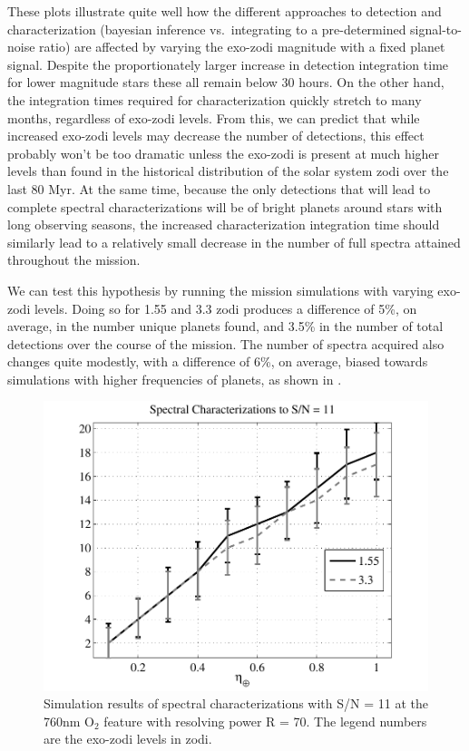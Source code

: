  These plots illustrate quite well how the different approaches to detection and characterization (bayesian inference vs.~integrating to a pre-determined signal-to-noise ratio) are affected by varying the exo-zodi magnitude with a fixed  planet signal.  Despite the proportionately larger increase in detection integration time for lower magnitude stars these all remain below 30 hours.  On the other hand, the integration times required for characterization quickly stretch to many months, regardless of exo-zodi levels.  From this, we can predict that while increased exo-zodi levels may decrease the number of detections, this effect probably won't be too dramatic unless the exo-zodi is present at much higher levels than found in the historical distribution of the solar system zodi over the last 80 Myr.  At the same time, because the only detections that will lead to complete spectral characterizations will be of bright planets around stars with long observing seasons, the increased characterization integration time should similarly lead to a relatively small decrease in the number of full spectra attained throughout the mission.
 
We can test this hypothesis by running the mission simulations with varying exo-zodi levels.  Doing so for 1.55 and 3.3 zodi produces a difference of 5\%, on average, in the number unique planets found, and 3.5\% in the number of total detections over the course of the mission.  The number of spectra acquired also changes quite modestly, with a difference of 6\%, on average, biased towards simulations with higher frequencies of planets, as shown in .
\begin{figure}[ht]
 \begin{center}
   \includegraphics[width=4.5in,clip=true,trim=0.25in 0in 0.5in 0.05in]{./figures/ASPECTRA_varZ}
 \end{center}
 \caption[Spectral characterizations at varying exo-zodi levels]{ \label{fig:ASPECTRA_varZ} Simulation results of spectral characterizations with S/N = 11 at the 760nm O$_2$ feature with resolving power R = 70. The legend numbers are the exo-zodi levels in zodi.}
 \end{figure}
 
